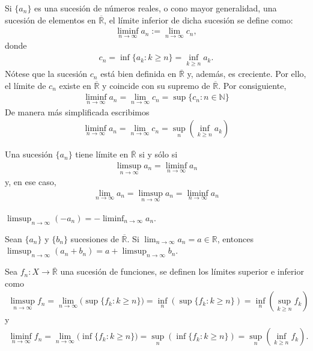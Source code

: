 \begin{defi}
 Si $\{a_n\}$ es una sucesión de números reales, o cono mayor generalidad, una sucesión de elementos en $\overline{\mathbb{R}}$, el límite inferior de dicha sucesión se define como:
\begin{align*}
     \liminf_{n \to \infty}{a_n} := \lim_{n \to \infty}{c_n},
\end{align*}
donde
\begin{align*}
     c_n = \inf{\{ a_k : k \ge n\}} = \inf_{k \ge n}{a_k}.
\end{align*}
Nótese que la sucesión $c_n$ está bien definida en $\overline{\mathbb{R}}$ y, además, es creciente. Por ello, el límite de $c_n$ existe en $\overline{\mathbb{R}}$ y coincide con su supremo de $\overline{\mathbb{R}}$. Por consiguiente,
\begin{align*}
    \liminf_{n \to \infty}{a_n} = \lim_{n \to \infty}{c_n} = \sup{\{ c_n : n \in \mathbb{N}\}}
\end{align*}
De manera más simplificada escribimos
\begin{align*}
    \liminf_{n \to \infty}{a_n} = \lim_{n \to \infty}{c_n} = \sup_n{(\inf_{k \ge n}{a_k})}
\end{align*}
\end{defi}

\begin{prop}
Una sucesión $\{ a_n \}$ tiene límite en $\overline{\mathbb{R}}$ si y sólo si
\begin{align*}
    \limsup_{n \to \infty}{a_n} = \liminf_{n \to \infty}{a_n}
\end{align*}
y, en ese caso,
\begin{align*}
    \lim_{n \to \infty}{a_n} = \limsup_{n \to \infty}{a_n} = \liminf_{n \to \infty}{a_n}
\end{align*}
\end{prop}

\begin{obs}
$\limsup_{n \to \infty}{(-a_n)} = -\liminf_{n \to \infty}{a_n}$.
\end{obs}
\begin{prop}
Sean $\{ a_n\}$ y $\{ b_n \}$ sucesiones de $\overline{\mathbb{R}}$. Si $\lim_{n \to \infty}{a_n} = a \in \mathbb{R}$, entonces $\limsup_{n \to \infty}{(a_n + b_n)} = a + \limsup_{n \to \infty}{b_n}$.
\end{prop}

\begin{defi}
 Sea $f_n: X \longrightarrow \overline{\mathbb{R}}$ una sucesión de funciones, se definen los límites superior e inferior como
\begin{align*}
     \limsup_{n \to \infty}{f_n} = \lim_{n \to \infty}{(\sup\{ f_k : k \ge n \}}) = \inf_n(\sup\{ f_k : k \ge n\}) = \inf_n(\sup_{k \ge n}{f_k})
\end{align*}
y
\begin{align*}
     \liminf_{n \to \infty}{f_n} = \lim_{n \to \infty}{(\inf \{ f_k : k \ge n \}}) = \sup_n(\inf\{ f_k : k \ge n\}) = \sup_n(\inf_{k \ge n}{f_k}).
\end{align*}
\end{defi}

